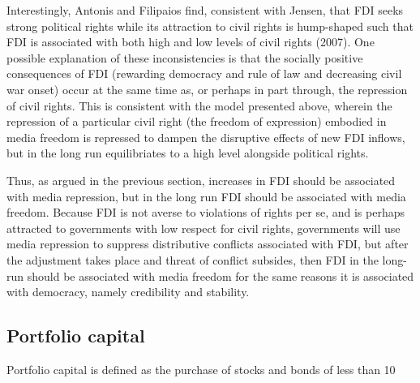 \documentclass[a4paper]{article}\usepackage[]{graphicx}\usepackage[]{color}
\begin{document}
Interestingly, Antonis and Filipaios find, consistent with Jensen, that FDI seeks strong political rights while its attraction to civil rights is hump-shaped such that FDI is associated with both high and low levels of civil rights (2007). One possible explanation of these inconsistencies is that the socially positive consequences of FDI (rewarding democracy and rule of law and decreasing civil war onset) occur at the same time as, or perhaps in part through, the repression of civil rights. This is consistent with the model presented above, wherein the repression of a particular civil right (the freedom of expression) embodied in media freedom is repressed to dampen the disruptive effects of new FDI inflows, but in the long run equilibriates to a high level alongside political rights.

Thus, as argued in the previous section, increases in FDI should be associated with media repression, but in the long run FDI should be associated with media freedom. Because FDI is not averse to violations of rights per se, and is perhaps attracted to governments with low respect for civil rights, governments will use media repression to suppress distributive conflicts associated with FDI, but after the adjustment takes place and threat of conflict subsides, then FDI in the long-run should be associated with media freedom for the same reasons it is associated with democracy, namely credibility and stability.

\subsection{Portfolio capital}

Portfolio capital is defined as the purchase of stocks and bonds of less than 10%
\end{document}
